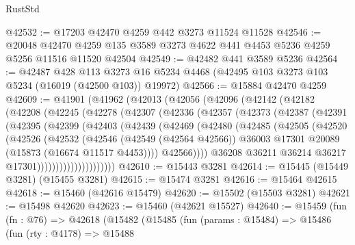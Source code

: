 \begin{lexlean}{RustStd}
\begin{coremodule}
@42532 := @17203 @42470 @4259 @442 @3273 @11524 @11528
@42546 := @20048
    @42470
    @4259
    @135
    @3589
    @3273
    @4622
    @441
    @4453
    @5236
    @4259
    @5256
    @11516
    @11520
    @42504
@42549 := @42482 @441 @3589 @5236
@42564 := @42487
    @428
    @113
    @3273
    @16
    @5234
    @4468
    (@42495 @103 @3273 @103 @5234 (@16019 (@42500 @103)) @19972)
@42566 := @15884 @42470 @4259
@42609 := @41901
    (@41962
      (@42013
        (@42056
          (@42096
            (@42142
              (@42182
                (@42208
                  (@42245
                    (@42278
                      (@42307
                        (@42336
                          (@42357
                            (@42373
                              (@42387
                                (@42391
                                  (@42395
                                    (@42399
                                      (@42403
                                        (@42439
                                          (@42469
                                            (@42480
                                              (@42485
                                                (@42505
                                                  (@42520
                                                    (@42526
                                                      (@42532
                                                        (@42546
                                                          (@42549 (@42564 @42566))
                                                          @36003
                                                          @17301
                                                          @20089
                                                          (@15873 (@16674 @11517 @4453))))
                                                      @42566))))
                                              @36208
                                              @36211
                                              @36214
                                              @36217
                                              @17301)))))))))))))))))))))
@42610 := @15443 @3281
@42614 := @15445 (@15449 @3281) (@15455 @3281)
@42615 := @15474 @3281
@42616 := @15464 @42615
@42618 := @15460 (@42616 @15479)
@42620 := @15502 (@15503 @3281)
@42621 := @15498 @42620
@42623 := @15460 (@42621 @15527)
@42640 := @15459
    (fun (fn : @76) =>
    @42618
      (@15482
        (@15485
          (fun (params : @15484) =>
          @15486
            (fun (rty : @4178) =>
            @15488

\end{coremodule}
\end{lexlean}

